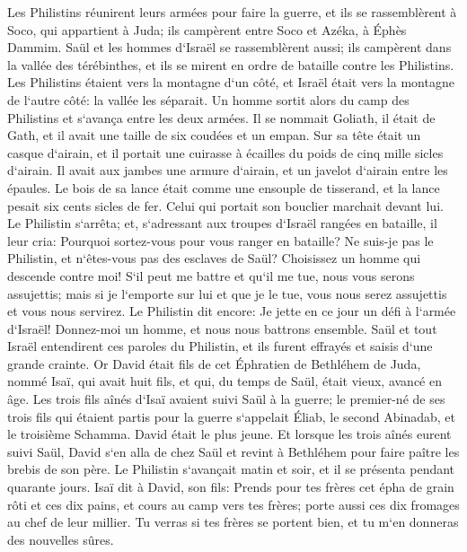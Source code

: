 \verse Les Philistins réunirent leurs armées pour faire la guerre, et ils se rassemblèrent à Soco, qui appartient à Juda; ils campèrent entre Soco et Azéka, à Éphès Dammim. 
\verse Saül et les hommes d`Israël se rassemblèrent aussi; ils campèrent dans la vallée des térébinthes, et ils se mirent en ordre de bataille contre les Philistins. 
\verse Les Philistins étaient vers la montagne d`un côté, et Israël était vers la montagne de l`autre côté: la vallée les séparait. 
\verse Un homme sortit alors du camp des Philistins et s`avança entre les deux armées. Il se nommait Goliath, il était de Gath, et il avait une taille de six coudées et un empan. 
\verse Sur sa tête était un casque d`airain, et il portait une cuirasse à écailles du poids de cinq mille sicles d`airain. 
\verse Il avait aux jambes une armure d`airain, et un javelot d`airain entre les épaules. 
\verse Le bois de sa lance était comme une ensouple de tisserand, et la lance pesait six cents sicles de fer. Celui qui portait son bouclier marchait devant lui. 
\verse Le Philistin s`arrêta; et, s`adressant aux troupes d`Israël rangées en bataille, il leur cria: Pourquoi sortez-vous pour vous ranger en bataille? Ne suis-je pas le Philistin, et n`êtes-vous pas des esclaves de Saül? Choisissez un homme qui descende contre moi! 
\verse S`il peut me battre et qu`il me tue, nous vous serons assujettis; mais si je l`emporte sur lui et que je le tue, vous nous serez assujettis et vous nous servirez. 
\verse Le Philistin dit encore: Je jette en ce jour un défi à l`armée d`Israël! Donnez-moi un homme, et nous nous battrons ensemble. 
\verse Saül et tout Israël entendirent ces paroles du Philistin, et ils furent effrayés et saisis d`une grande crainte. 
\verse Or David était fils de cet Éphratien de Bethléhem de Juda, nommé Isaï, qui avait huit fils, et qui, du temps de Saül, était vieux, avancé en âge. 
\verse Les trois fils aînés d`Isaï avaient suivi Saül à la guerre; le premier-né de ses trois fils qui étaient partis pour la guerre s`appelait Éliab, le second Abinadab, et le troisième Schamma. 
\verse David était le plus jeune. Et lorsque les trois aînés eurent suivi Saül, 
\verse David s`en alla de chez Saül et revint à Bethléhem pour faire paître les brebis de son père. 
\verse Le Philistin s`avançait matin et soir, et il se présenta pendant quarante jours. 
\verse Isaï dit à David, son fils: Prends pour tes frères cet épha de grain rôti et ces dix pains, et cours au camp vers tes frères; 
\verse porte aussi ces dix fromages au chef de leur millier. Tu verras si tes frères se portent bien, et tu m`en donneras des nouvelles sûres. 
